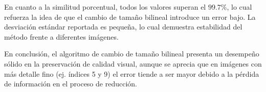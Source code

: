 \documentclass[12pt,a4paper]{article}
\begin{document}
En cuanto a la similitud porcentual, todos los valores superan el $99.7\%$, lo cual refuerza la idea de que el cambio de tamaño bilineal introduce un error bajo. La desviación estándar reportada es pequeña, lo cual demuestra estabilidad del método frente a diferentes imágenes.

En conclusión, el algoritmo de cambio de tamaño bilineal presenta un desempeño sólido en la preservación de calidad visual, aunque se aprecia que en imágenes con más detalle fino (ej. índices 5 y 9) el error tiende a ser mayor debido a la pérdida de información en el proceso de reducción.
\end{document}
